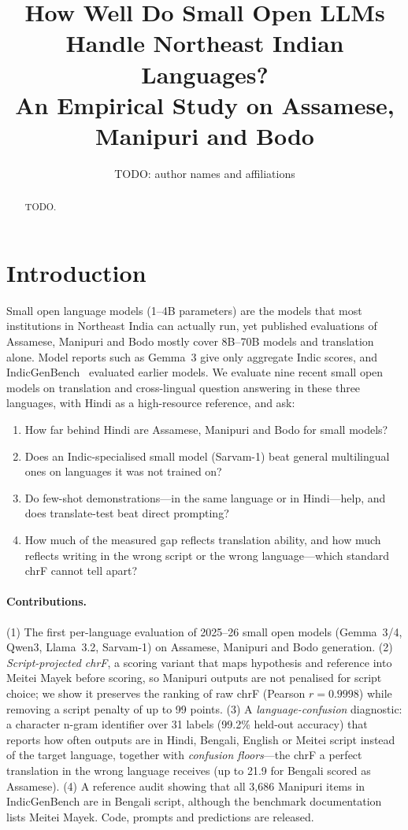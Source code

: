 \documentclass[11pt]{article}
\title{How Well Do Small Open LLMs Handle Northeast Indian Languages?\\
An Empirical Study on Assamese, Manipuri and Bodo}
\author{TODO: author names and affiliations}
\date{}
\begin{document}
\maketitle

\begin{abstract}
TODO.
\end{abstract}

\section{Introduction}
Small open language models (1--4B parameters) are the models that most institutions in
Northeast India can actually run, yet published evaluations of Assamese, Manipuri and Bodo
mostly cover 8B--70B models and translation alone. Model reports such as Gemma~3 give only
aggregate Indic scores, and IndicGenBench~\citep{singh2024indicgenbench} evaluated earlier models.
We evaluate nine recent small open models on translation and cross-lingual question answering
in these three languages, with Hindi as a high-resource reference, and ask:
\begin{enumerate}
  \item How far behind Hindi are Assamese, Manipuri and Bodo for small models?
  \item Does an Indic-specialised small model (Sarvam-1) beat general multilingual ones on languages it was not trained on?
  \item Do few-shot demonstrations---in the same language or in Hindi---help, and does translate-test beat direct prompting?
  \item How much of the measured gap reflects translation ability, and how much reflects writing in
        the wrong script or the wrong language---which standard chrF cannot tell apart?
\end{enumerate}
\paragraph{Contributions.}
(1) The first per-language evaluation of 2025--26 small open models (Gemma~3/4, Qwen3, Llama~3.2,
Sarvam-1) on Assamese, Manipuri and Bodo generation.
(2) \emph{Script-projected chrF}, a scoring variant that maps hypothesis and reference into Meitei
Mayek before scoring, so Manipuri outputs are not penalised for script choice; we show it preserves
the ranking of raw chrF (Pearson $r=0.9998$) while removing a script penalty of up to 99 points.
(3) A \emph{language-confusion} diagnostic: a character n-gram identifier over 31 labels (99.2\%
held-out accuracy) that reports how often outputs are in Hindi, Bengali, English or Meitei script
instead of the target language, together with \emph{confusion floors}---the chrF a perfect
translation in the wrong language receives (up to 21.9 for Bengali scored as Assamese).
(4) A reference audit showing that all 3{,}686 Manipuri items in IndicGenBench are in Bengali
script, although the benchmark documentation lists Meitei Mayek.
Code, prompts and predictions are released.
\end{document}
